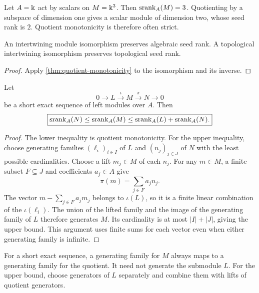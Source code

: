 \begin{microexample}[title={A quotient can strictly lower seed rank}]
Let \(A=\Bbbk\) act by scalars on \(M=\Bbbk^3\).  Then \(\operatorname{srank}_A(M)=3\).  Quotienting by a subspace of dimension one gives a scalar module of dimension two, whose seed rank is \(2\).  Quotient monotonicity is therefore often strict.
\end{microexample}


\begin{corollary}
\label{cor:isomorphism-invariance}
An intertwining module isomorphism preserves algebraic seed rank.  A topological intertwining isomorphism preserves topological seed rank.
\end{corollary}

\begin{proof}
Apply \cref{thm:quotient-monotonicity} to the isomorphism and its inverse.
\end{proof}

\begin{theorem}
\label{thm:exact-sequence-bounds}
Let
\[
0\longrightarrow L\xrightarrow{\iota}M\xrightarrow{\pi}N\longrightarrow0
\]
be a short exact sequence of left modules over $A$.  Then
\[
\boxed{
\operatorname{srank}_A(N)\leq\operatorname{srank}_A(M)
\leq\operatorname{srank}_A(L)+\operatorname{srank}_A(N).
}
\]
\end{theorem}

\begin{proof}
The lower inequality is quotient monotonicity. For the upper inequality, choose generating families $(\ell_i)_{i\in I}$ of $L$ and $(n_j)_{j\in J}$ of $N$ with the least possible cardinalities. Choose a lift $m_j\in M$ of each $n_j$. For any $m\in M$, a finite subset $F\subseteq J$ and coefficients $a_j\in A$ give
\[
\pi(m)=\sum_{j\in F}a_jn_j.
\]
The vector $m-\sum_{j\in F}a_jm_j$ belongs to $\iota(L)$, so it is a finite linear combination of the $\iota(\ell_i)$. The union of the lifted family and the image of the generating family of $L$ therefore generates $M$. Its cardinality is at most $|I|+|J|$, giving the upper bound. This argument uses finite sums for each vector even when either generating family is infinite.
\end{proof}

\begin{hypothesisguide}
For a short exact sequence, a generating family for \(M\) always maps to a generating family for the quotient.  It need not generate the submodule \(L\).  For the upper bound, choose generators of \(L\) separately and combine them with lifts of quotient generators.
\end{hypothesisguide}


